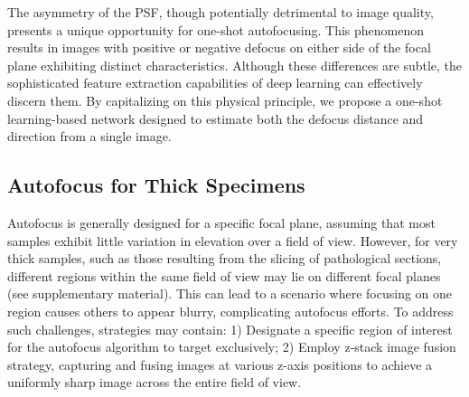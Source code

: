 The asymmetry of the PSF, though potentially detrimental to image quality, presents a unique opportunity for one-shot autofocusing. This phenomenon results in images with positive or negative defocus on either side of the focal plane exhibiting distinct characteristics. Although these differences are subtle, the sophisticated feature extraction capabilities of deep learning can effectively discern them. By capitalizing on this physical principle, we propose a one-shot learning-based network designed to estimate both the defocus distance and direction from a single image.

\subsection{Autofocus for Thick Specimens}

Autofocus is generally designed for a specific focal plane, assuming that most samples exhibit little variation in elevation over a field of view.
However, for very thick samples, such as those resulting from the slicing of pathological sections, different regions within the same field of view may lie on different focal planes (see supplementary material). This can lead to a scenario where focusing on one region causes others to appear blurry, complicating autofocus efforts.
To address such challenges, strategies may contain: 1) Designate a specific region of interest for the autofocus algorithm to target exclusively; 2) Employ z-stack image fusion strategy, capturing and fusing images at various z-axis positions to achieve a uniformly sharp image across the entire field of view.


